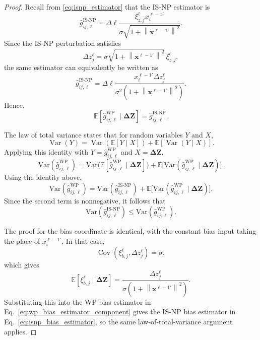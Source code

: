 \begin{proof}
Recall from \eqref{eq:isnp_estimator} that the IS-NP estimator is
\begin{equation}
\widehat{g}^{\mathrm{IS\text{-}NP}}_{ij,\ell}
=
\Delta \ell
\frac{\xi^\ell_{z,j} x_i^{\ell-1\prime}}
{\sigma \sqrt{1+\left\|\mathbf{x}^{\ell-1\prime}\right\|^2}}.
\end{equation}
Since the IS-NP perturbation satisfies
\begin{equation}
\Delta z^\ell_j
=
\sigma \sqrt{1+\left\|\mathbf{x}^{\ell-1\prime}\right\|^2}\,\xi^\ell_{z,j},
\end{equation}
the same estimator can equivalently be written as
\begin{equation}
\widehat{g}^{\mathrm{IS\text{-}NP}}_{ij,\ell}
=
\Delta \ell
\frac{x_i^{\ell-1\prime}\Delta z^\ell_j}
{\sigma^2 \left(1+\left\|\mathbf{x}^{\ell-1\prime}\right\|^2\right)}.
\end{equation}
Hence,
\begin{equation}
\mathbb{E}\!\left[
\widehat{g}^{\mathrm{WP}}_{ij,\ell}
\mid
\boldsymbol{\Delta Z}
\right]
=
\widehat{g}^{\mathrm{IS\text{-}NP}}_{ij,\ell}.
\end{equation}

The law of total variance states that for random variables \(Y\) and \(X\),
\[
\operatorname{Var}(Y)
=
\operatorname{Var}\!\left(\mathbb{E}[Y\mid X]\right)
+
\mathbb{E}\!\left[\operatorname{Var}(Y\mid X)\right].
\]
Applying this identity with \(Y=\widehat{g}^{\mathrm{WP}}_{ij,\ell}\) and \(X=\boldsymbol{\Delta Z}\),
\[
\mathrm{Var}(\widehat{g}^{\mathrm{WP}}_{ij,\ell})
=
\mathrm{Var}\!\bigl(\mathbb{E}[\widehat{g}^{\mathrm{WP}}_{ij,\ell}\mid \boldsymbol{\Delta Z}]\bigr)
+
\mathbb{E}\!\bigl[\mathrm{Var}(\widehat{g}^{\mathrm{WP}}_{ij,\ell}\mid \boldsymbol{\Delta Z})\bigr].
\]
Using the identity above,
\[
\mathrm{Var}(\widehat{g}^{\mathrm{WP}}_{ij,\ell})
=
\mathrm{Var}(\widehat{g}^{\mathrm{IS\text{-}NP}}_{ij,\ell})
+
\mathbb{E}\!\bigl[\mathrm{Var}(\widehat{g}^{\mathrm{WP}}_{ij,\ell}\mid \boldsymbol{\Delta Z})\bigr].
\]
Since the second term is nonnegative, it follows that
\[
\mathrm{Var}(\widehat{g}^{\mathrm{IS\text{-}NP}}_{ij,\ell})
\le
\mathrm{Var}(\widehat{g}^{\mathrm{WP}}_{ij,\ell}).
\]

The proof for the bias coordinate is identical, with the constant bias input taking the place of \(x_i^{\ell-1\prime}\). In that case,
\[
\operatorname{Cov}\!\left(\xi^\ell_{b,j},\Delta z^\ell_j\right)=\sigma,
\]
which gives
\[
\mathbb{E}\!\left[\xi^\ell_{b,j}\mid \boldsymbol{\Delta Z}\right]
=
\frac{\Delta z^\ell_j}
{\sigma\left(1+\left\|\mathbf{x}^{\ell-1\prime}\right\|^2\right)}.
\]
Substituting this into the WP bias estimator in Eq.~\eqref{eq:wp_bias_estimator_component} gives the IS-NP bias estimator in Eq.~\eqref{eq:isnp_bias_estimator}, so the same law-of-total-variance argument applies.
\end{proof}

